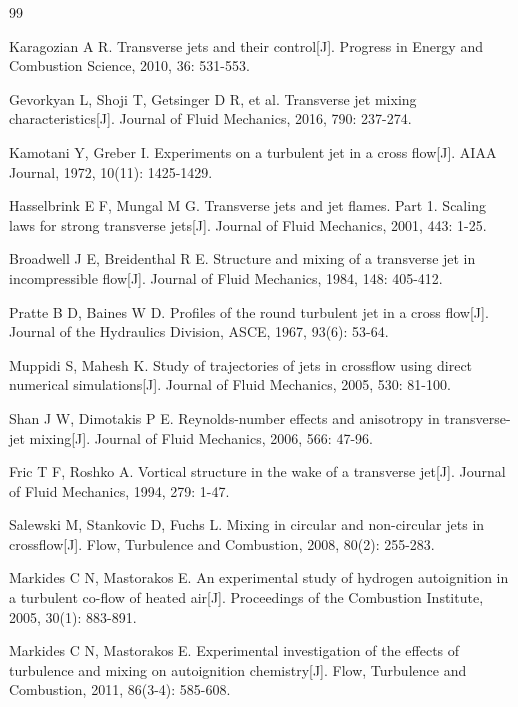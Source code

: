 \documentclass[master]{sdustthesis}  %
\begin{document}
\begin{thebibliography}{99}
	
	 Karagozian A R. Transverse jets and their control[J]. Progress in Energy and Combustion Science, 2010, 36: 531-553.
	
	 Gevorkyan L, Shoji T, Getsinger D R, et al. Transverse jet mixing characteristics[J]. Journal of Fluid Mechanics, 2016, 790: 237-274.
	
	 Kamotani Y, Greber I. Experiments on a turbulent jet in a cross flow[J]. AIAA Journal, 1972, 10(11): 1425-1429.
	
	 Hasselbrink E F, Mungal M G. Transverse jets and jet flames. Part 1. Scaling laws for strong transverse jets[J]. Journal of Fluid Mechanics, 2001, 443: 1-25.
	
	 Broadwell J E, Breidenthal R E. Structure and mixing of a transverse jet in incompressible flow[J]. Journal of Fluid Mechanics, 1984, 148: 405-412.
	
	 Pratte B D, Baines W D. Profiles of the round turbulent jet in a cross flow[J]. Journal of the Hydraulics Division, ASCE, 1967, 93(6): 53-64.
	
	 Muppidi S, Mahesh K. Study of trajectories of jets in crossflow using direct numerical simulations[J]. Journal of Fluid Mechanics, 2005, 530: 81-100.
	
	 Shan J W, Dimotakis P E. Reynolds-number effects and anisotropy in transverse-jet mixing[J]. Journal of Fluid Mechanics, 2006, 566: 47-96.
	
	 Fric T F, Roshko A. Vortical structure in the wake of a transverse jet[J]. Journal of Fluid Mechanics, 1994, 279: 1-47.
	
	 Salewski M, Stankovic D, Fuchs L. Mixing in circular and non-circular jets in crossflow[J]. Flow, Turbulence and Combustion, 2008, 80(2): 255-283.
	
	 Markides C N, Mastorakos E. An experimental study of hydrogen autoignition in a turbulent co-flow of heated air[J]. Proceedings of the Combustion Institute, 2005, 30(1): 883-891.
	
	 Markides C N, Mastorakos E. Experimental investigation of the effects of turbulence and mixing on autoignition chemistry[J]. Flow, Turbulence and Combustion, 2011, 86(3-4): 585-608.
	

\end{thebibliography}
\end{document}
